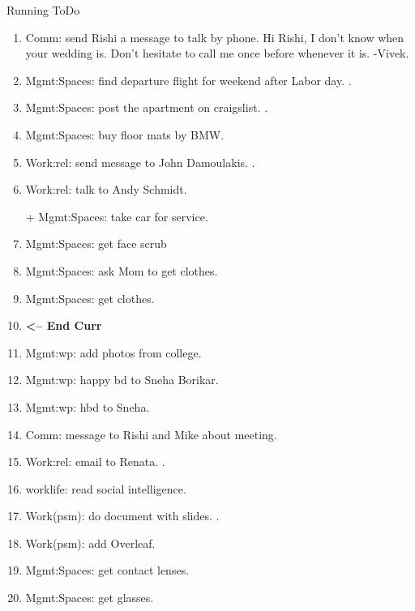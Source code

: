 \begin{columns}
\begin{column}{0.6\linewidth}
\begin{block}{Running ToDo}
\begin{enumerate}
        \item \tiny Comm: send Rishi a message to talk by phone. 
          Hi Rishi, I don't know when your wedding is. Don't hesitate
          to call me once before whenever it is. -Vivek.

       \item \tiny Mgmt:Spaces: find departure flight for weekend
         after Labor day.    . 
         
      \item \tiny Mgmt:Spaces: post the apartment on
        craigslist.  .

      \item \tiny Mgmt:Spaces: buy floor mats by BMW. 

     \item \tiny Work:rel: send message to John Damoulakis.  . 
     \item \tiny Work:rel: talk to Andy Schmidt.  

        +
        Mgmt:Spaces: take car for service. 

      \item \tiny Mgmt:Spaces: get face scrub
        \item \tiny Mgmt:Spaces: ask Mom to get clothes.
        \item \tiny Mgmt:Spaces: get clothes. 

        \item \tiny \textbf{ <-- End Curr }

        \item \tiny Mgmt:wp: add photos from college.           
        \item \tiny Mgmt:wp: happy bd to Sneha Borikar. 
        \item \tiny Mgmt:wp: hbd to Sneha. 
          
        \item \tiny Comm: message to Rishi and Mike about meeting. 
        \item \tiny Work:rel: email to Renata. . 
        \item \tiny worklife: read social intelligence.  
        \item \tiny Work(psm): do document with slides. .    
        \item \tiny Work(psm): add Overleaf.            
        \item \tiny Mgmt:Spaces: get contact lenses.
        \item \tiny Mgmt:Spaces: get glasses. 



\end{enumerate}
\end{block}
\end{column}
\end{columns}
